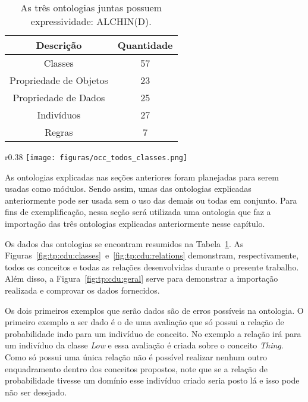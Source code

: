\begin{table}[b]
	\caption{As três ontologias juntas possuem expressividade: ALCHIN(D).}
	\label{tab:tp:cdu:geral}
	\begin{center}
	\begin{tabular}{|c|c|}
		\hline
		Descrição & Quantidade \\ \hline
		Classes &  57 		\\ \hline
		Propriedade de Objetos & 23 \\ \hline
		Propriedade de Dados & 25 \\ \hline
		Indivíduos &  27	\\ \hline
		Regras & 7 \\ \hline
	\end{tabular}
	\end{center}
\end{table}

\begin{wrapfigure}{r}{0.38\textwidth}
  \texttt{[image: figuras/occ\_todos\_classes.png]}
  \caption{Taxonomia das 3 ontologias.}
  \label{fig:tp:cdu:classes}
\end{wrapfigure}

As ontologias explicadas nas seções anteriores foram planejadas para serem
usadas como módulos. Sendo assim, umas das ontologias explicadas anteriormente
pode ser usada sem o uso das demais ou todas em conjunto. Para fins de
exemplificação, nessa seção será utilizada uma ontologia que faz a importação
das três ontologias explicadas anteriormente nesse capítulo.

Os dados das ontologias se encontram resumidos na
Tabela~\ref{tab:tp:cdu:geral}. As
Figuras~\ref{fig:tp:cdu:classes}~e~\ref{fig:tp:cdu:relations} demonstram,
respectivamente, todos os conceitos e todas as relações desenvolvidas durante
o presente trabalho. Além disso, a Figura~\ref{fig:tp:cdu:geral} serve para
demonstrar a importação realizada e comprovar os dados fornecidos.

Os dois primeiros exemplos que serão dados são de erros possíveis na
ontologia. O primeiro exemplo a ser dado é o de uma avaliação que só
possui a relação de probabilidade indo para um indivíduo de conceito. No
exemplo a relação irá para um indivíduo da classe \emph{Low} e essa avaliação
é criada sobre o conceito \emph{Thing}. Como só possui uma única relação não é
possível realizar nenhum outro enquadramento dentro dos conceitos propostos,
note que se a relação de probabilidade tivesse um domínio esse indivíduo
criado seria posto lá e isso pode não ser desejado.

